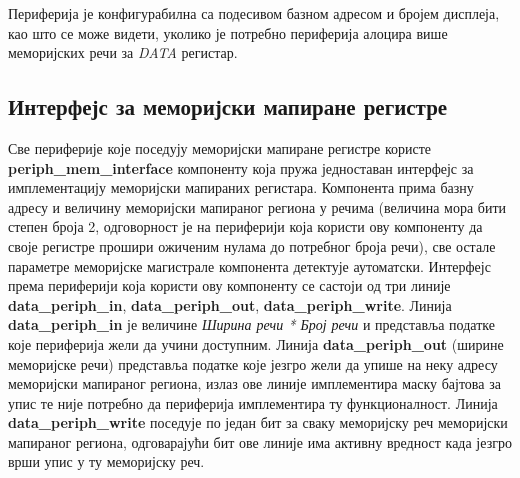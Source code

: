 Периферија је конфигурабилна са подесивом базном адресом и бројем дисплеја, као што се може видети, уколико је потребно периферија алоцира више меморијских речи за \textit{DATA} регистар.

\subsection{Интерфејс за меморијски мапиране регистре}

Све периферије које поседују меморијски мапиране регистре користе \textbf{periph\_mem\_interface} компоненту која пружа једноставан интерфејс за имплементацију меморијски мапираних регистара. Компонента прима базну адресу и величину меморијски мапираног региона у речима (величина мора бити  степен броја 2, одговорност је на периферији која користи ову компоненту да своје регистре прошири ожиченим нулама до потребног броја речи), све остале параметре меморијске магистрале компонента детектује аутоматски. Интерфејс према периферији која користи ову компоненту се састоји од три линије \textbf{data\_periph\_in}, \textbf{data\_periph\_out}, \textbf{data\_periph\_write}. Линија \textbf{data\_periph\_in} је величине \textit{Ширина речи * Број речи} и представља податке које периферија жели да учини доступним. Линија \textbf{data\_periph\_out} (ширине меморијске речи) представља податке које језгро жели да упише на неку адресу меморијски мапираног региона, излаз ове линије имплементира маску бајтова за упис те није потребно да периферија имплементира ту функционалност. Линија \textbf{data\_periph\_write} поседује по један бит за сваку меморијску реч меморијски мапираног региона, одговарајући бит ове линије има активну вредност када језгро врши упис у ту меморијску реч.\newpage

